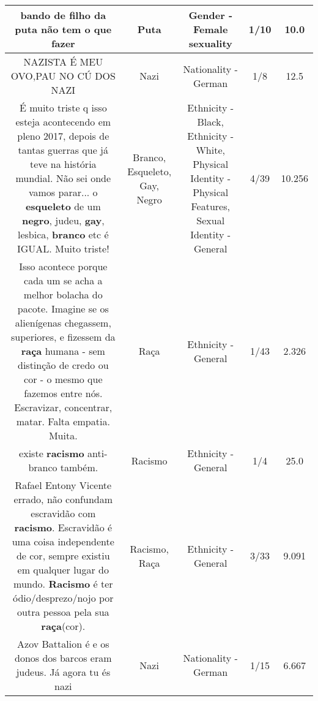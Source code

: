 \documentclass[11pt]{article}
\newlength\mylength
\begin{document}
\begin{center}
\begin{longtable}{|C{.65\mylength}|C{.30\mylength}|C{.12\mylength}|C{.12\mylength}|C{.12\mylength}|}
  \small bando de filho da \textbf{puta} não tem o que fazer\normalsize   & Puta & Gender - Female sexuality & 1/10 & 10.0 \\  \hline
  \small NAZISTA É MEU OVO,PAU NO CÚ DOS NAZI\normalsize   & Nazi & Nationality - German & 1/8 & 12.5 \\  \hline
  \small É muito triste q isso esteja acontecendo em pleno 2017, depois de tantas guerras que já teve na história mundial. Não sei onde vamos parar... o \textbf{esqueleto} de um \textbf{negro}, judeu, \textbf{gay}, lesbica, \textbf{branco} etc é IGUAL. Muito triste!\normalsize   & Branco, Esqueleto, Gay, Negro & Ethnicity - Black, Ethnicity - White, Physical Identity - Physical Features, Sexual Identity - General & 4/39 & 10.256 \\  \hline
  \small Isso acontece porque cada um se acha a melhor bolacha do pacote. Imagine se os alienígenas chegassem, superiores, e fizessem da \textbf{raça} humana - sem distinção de credo ou cor - o mesmo que fazemos entre nós. Escravizar, concentrar, matar. Falta empatia. Muita.\normalsize   & Raça & Ethnicity - General & 1/43 & 2.326 \\  \hline
  \small existe \textbf{racismo} anti-branco também.\normalsize   & Racismo & Ethnicity - General & 1/4 & 25.0 \\  \hline
  \small Rafael Entony Vicente errado, não confundam escravidão com \textbf{racismo}. Escravidão é uma coisa independente de cor, sempre existiu em qualquer lugar do mundo. \textbf{Racismo} é ter ódio/desprezo/nojo por outra pessoa pela sua \textbf{raça}(cor).\normalsize   & Racismo, Raça & Ethnicity - General & 3/33 & 9.091 \\  \hline
  \small Azov Battalion é e os donos dos barcos eram judeus. Já agora tu és nazi\normalsize   & Nazi & Nationality - German & 1/15 & 6.667 \\  \hline

\end{longtable}
\end{center}
\end{document}
